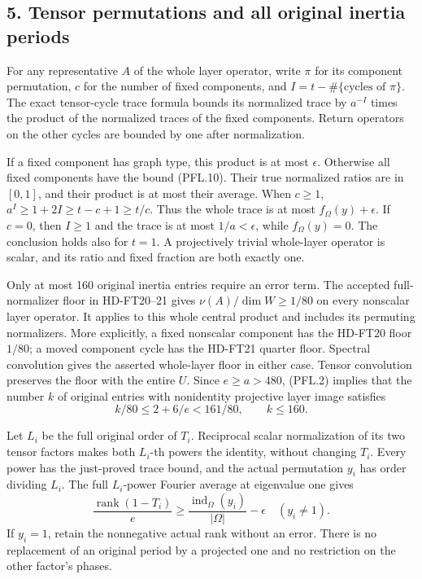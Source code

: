 \subsection*{5. Tensor permutations and all original inertia periods}

For any representative \(A\) of the whole layer operator, write
\(\pi\) for its component permutation, \(c\) for the number of
fixed components, and \(I=t-\#\{\text{cycles of }\pi\}\).
The exact tensor-cycle trace formula bounds its normalized trace
by \(a^{-I}\) times the product of the normalized traces of the
fixed components. Return operators on the other cycles are
bounded by one after normalization.

If a fixed component has graph type, this product is at most
\(\epsilon\). Otherwise all fixed components have the bound
(PFL.10). Their true normalized ratios are in \([0,1]\), and
their product is at most their average. When \(c\ge1\),
\(a^I\ge1+2I\ge t-c+1\ge t/c\).
Thus the whole trace is at most \(f_\Omega(y)+\epsilon\).
If \(c=0\), then \(I\ge1\) and the trace is at most
\(1/a<\epsilon\), while \(f_\Omega(y)=0\).
The conclusion holds also for \(t=1\). A projectively trivial
whole-layer operator is scalar, and its ratio and fixed fraction
are both exactly one.

Only at most 160 original inertia entries require an error term.
The accepted full-normalizer floor in HD-FT20--21 gives
\(\nu(A)/\dim W\ge1/80\) on every nonscalar layer operator.
It applies to this whole central product and includes its
permuting normalizers. More explicitly, a fixed nonscalar component
has the HD-FT20 floor \(1/80\); a moved component cycle has the
HD-FT21 quarter floor. Spectral convolution gives the asserted
whole-layer floor in either case.
Tensor convolution preserves the floor with the entire \(U\).
Since \(e\ge a>480\), (PFL.2) implies that the number \(k\) of
original entries with nonidentity projective layer image satisfies
\[
                  k/80\le2+6/e<161/80,\qquad k\le160.
 \tag{PFL.13}
\]

Let \(L_i\) be the full original order of \(T_i\). Reciprocal
scalar normalization of its two tensor factors makes both
\(L_i\)-th powers the identity, without changing \(T_i\).
Every power has the just-proved trace bound, and the actual
permutation \(y_i\) has order dividing \(L_i\).
The full \(L_i\)-power Fourier average at eigenvalue one gives
\[
 \frac{\operatorname{rank}(1-T_i)}e
       \ge\frac{\operatorname{ind}_\Omega(y_i)}{|\Omega|}
                 -\epsilon\quad(y_i\ne1).
 \tag{PFL.14}
\]
If \(y_i=1\), retain the nonnegative actual rank without an error.
There is no replacement of an original period by a projected
one and no restriction on the other factor's phases.

